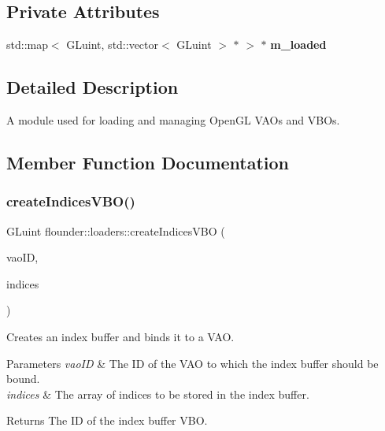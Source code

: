 \subsection*{Private Attributes}
\begin{DoxyCompactItemize}
\item 
\mbox{\label{classflounder_1_1loaders_a5d8c265b922c5e1ea5da3ee3ec90f4ad}} 
std\+::map$<$ G\+Luint, std\+::vector$<$ G\+Luint $>$ $\ast$ $>$ $\ast$ {\bfseries m\+\_\+loaded}
\end{DoxyCompactItemize}


\subsection{Detailed Description}
A module used for loading and managing Open\+GL V\+AO\textquotesingle{}s and V\+BO\textquotesingle{}s. 



\subsection{Member Function Documentation}
\mbox{\label{classflounder_1_1loaders_afcc6aaec9391699f25a014a7cd203592}} 
\subsubsection{\texorpdfstring{create\+Indices\+V\+B\+O()}{createIndicesVBO()}}
{\footnotesize\ttfamily G\+Luint flounder\+::loaders\+::create\+Indices\+V\+BO (\begin{DoxyParamCaption}\item[{G\+Luint \&}]{vao\+ID,  }\item[{const std\+::vector$<$ G\+Lint $>$ \&}]{indices }\end{DoxyParamCaption})}



Creates an index buffer and binds it to a V\+AO. 


\begin{DoxyParams}{Parameters}
{\em vao\+ID} & The ID of the V\+AO to which the index buffer should be bound. \\
\hline
{\em indices} & The array of indices to be stored in the index buffer. \\
\hline
\end{DoxyParams}
\begin{DoxyReturn}{Returns}
The ID of the index buffer V\+BO. 
\end{DoxyReturn}
\mbox{\label{classflounder_1_1loaders_a90123e47d1422f5e202a7ac439fee050}} 
